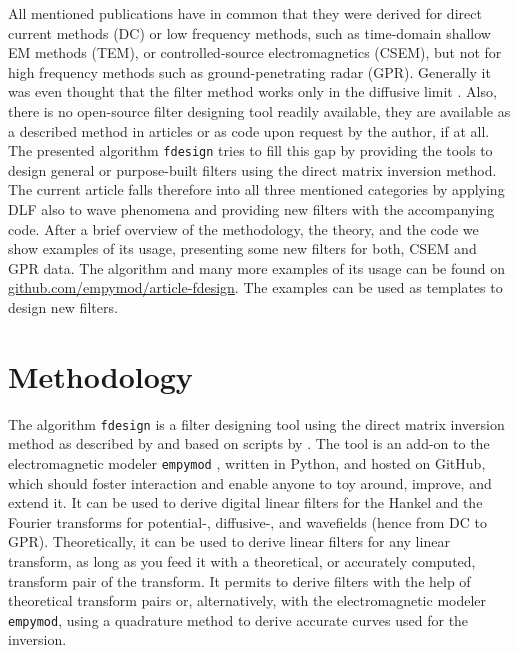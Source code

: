 \documentclass[paper,twocolumn,twoside]{geophysics}
\begin{document}
All mentioned publications have in common that they were derived for direct
current methods (DC) or low frequency methods, such as time-domain shallow EM
methods (TEM), or controlled-source electromagnetics (CSEM), but not for high
frequency methods such as ground-pe\-ne\-tra\-ting radar (GPR). Generally it
was even thought that the filter method works only in the diffusive limit
\citep[e.g.,][]{GEO.15.Hunziker}. Also, there is no open-source filter
designing tool readily available, they are available as a described method
in articles or as code upon request by the author, if at all. The presented
algorithm \texttt{fdesign} tries to fill this gap by providing the tools to
design general or purpose-built filters using the direct matrix inversion
method. The current article falls therefore into all three mentioned categories
by applying DLF also to wave phenomena and providing new filters with the
accompanying code. After a brief overview of the methodology, the theory, and
the code we show examples of its usage, presenting some new filters for both,
CSEM and GPR data. The algorithm and many more examples of its usage can be
found on
\href{https://github.com/empymod/article-fdesign}{github.com/empymod/article-fdesign}.
The examples can be used as templates to design new filters.


\section{Methodology}

The algorithm \texttt{fdesign} is a filter designing tool using the direct
matrix inversion method as described by \cite{GP.07.Kong} and based on scripts
by \cite{GEO.12.Key}. The tool is an add-on to the electromagnetic modeler
\texttt{empymod} \citep{GEO.17.Werthmuller}, written in Python, and hosted on
GitHub, which should foster interaction and enable anyone to toy around,
improve, and extend it. It can be used to derive digital linear filters for the
Hankel and the Fourier transforms for potential-, diffusive-, and wavefields
(hence from DC to GPR). Theoretically, it can be used to derive linear filters
for any linear transform, as long as you feed it with a theoretical, or
accurately computed, transform pair of the transform. It permits to derive
filters with the help of theoretical transform pairs or, alternatively, with
the electromagnetic modeler \texttt{empymod}, using a quadrature method to
derive accurate curves used for the inversion.
\end{document}
